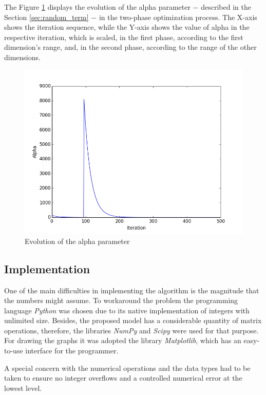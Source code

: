 \documentclass[tuberlin,cic,tc,openright,english,noabntcite,oneside]{iiufrgs}
\begin{document}
The Figure \ref{fig:alpha_evolution} displays the evolution of the alpha parameter $-$ described in the Section \ref{sec:random_term} $-$ in the two-phase optimization process. The X-axis shows the iteration sequence, while the Y-axis shows the value of alpha in the respective iteration, which is scaled, in the first phase, according to the first dimension's range, and, in the second phase, according to the range of the other dimensions.

\begin{figure}[H]
	\centering
    \caption{Evolution of the alpha parameter}
    \includegraphics[width=\textwidth]{fig_alpha_evolution}\par
    \label{fig:alpha_evolution}
\end{figure}

\subsection{Implementation}
One of the main difficulties in implementing the algorithm is the magnitude that the numbers might assume. To workaround the problem the programming language \emph{Python} was chosen due to its native implementation of integers with unlimited size. Besides, the proposed model has a considerable quantity of matrix operations, therefore, the libraries \emph{NumPy} and \emph{Scipy} were used for that purpose. For drawing the graphs it was adopted the library \emph{Matplotlib}, which has an easy-to-use interface for the programmer.

A special concern with the numerical operations and the data types had to be taken to ensure no integer overflows and a controlled numerical error at the lowest level.
\end{document}

